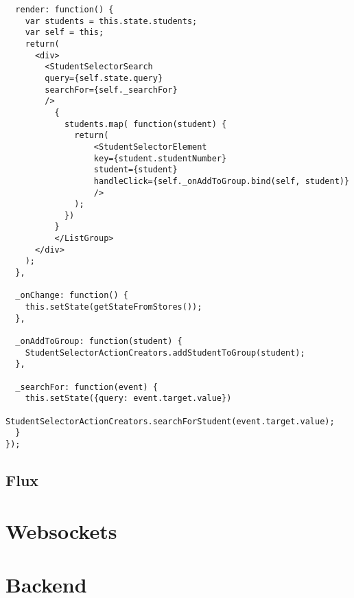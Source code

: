 \begin{lstlisting}
  render: function() {
    var students = this.state.students;
    var self = this;
    return(
      <div>
        <StudentSelectorSearch
        query={self.state.query}
        searchFor={self._searchFor}
        />
          {
            students.map( function(student) {
              return(
                  <StudentSelectorElement
                  key={student.studentNumber}
                  student={student}
                  handleClick={self._onAddToGroup.bind(self, student)}
                  />
              );
            })
          }
          </ListGroup>
      </div>
    );
  },

  _onChange: function() {
    this.setState(getStateFromStores());
  },

  _onAddToGroup: function(student) {
    StudentSelectorActionCreators.addStudentToGroup(student);
  },

  _searchFor: function(event) {
    this.setState({query: event.target.value})
    StudentSelectorActionCreators.searchForStudent(event.target.value);
  }
});

\end{lstlisting}


\subsection{Flux}

\section{Websockets}

\section{Backend}

